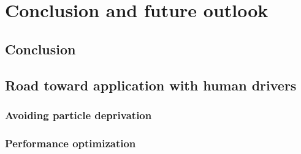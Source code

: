 \chapter{Conclusion and future outlook}
\label{sec:conclusion}

\section{Conclusion}




\section{Road toward application with human drivers}
\subsection{Avoiding particle deprivation}

\subsection{Performance optimization}
\label{sec:perf_opt}




